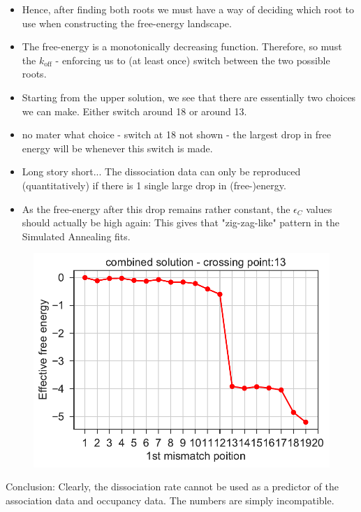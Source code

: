 \documentclass[a4paper,twoside]{revtex4-1}
\newcommand{\rate }[1]{\ensuremath{k_{\text{#1}}} }
\begin{document}
\begin{itemize}
\item Hence, after finding both roots we must have a way of deciding which root to use when constructing the free-energy landscape. 
\item The free-energy is a monotonically decreasing function. Therefore, so must the $\rate{off}$ - enforcing us to (at least once) switch between the two possible roots. 
\item Starting from the upper solution, we see that there are essentially two choices we can make. Either switch around 18 or around 13. 
\item no mater what choice - switch at 18 not shown - the largest drop in free energy will be whenever this switch is made. 
\item Long story short... The dissociation data can only be reproduced (quantitatively) if there is 1 single large drop in (free-)energy.
\item As the free-energy after this drop remains rather constant, the $\epsilon_C$ values should actually be high again: This gives that "zig-zag-like" pattern in the Simulated Annealing fits.  
\end{itemize}

\begin{figure}[H]
\includegraphics[scale=0.5]{fig11_10_10_2018.pdf}
\end{figure}

Conclusion: Clearly, the dissociation rate cannot be used as a predictor of the association data and occupancy data.  The numbers are simply incompatible. 
\end{document}
